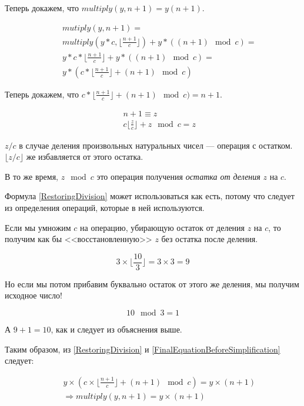 \documentclass{article}
\begin{document}
Теперь докажем, что \(multiply(y, n+1) = y(n+1)\).

\begin{eqnarray}
    &&mutiply(y, n+1) =\\
    &&multiply(y * c, \lfloor \frac{n+1}{c} \rfloor) + y * ((n+1) \mod c) =\\
    &&y*c*\lfloor \frac{n+1}{c} \rfloor + y*((n+1) \mod c) =\\
    &&y*(c * \lfloor \frac{n+1}{c} \rfloor + (n+1) \mod c) \label{FinalEquationBeforeSimplification}
\end{eqnarray}

Теперь докажем, что \(c * \lfloor \frac{n+1}{c} \rfloor + (n+1) \mod c) = n+1\).

\begin{eqnarray}
    &&n+1 \equiv z \\
    &&c\lfloor \frac{z}{c} \rfloor + z \mod c = z \label{RestoringDivision}
\end{eqnarray}

\(z/c\) в случае деления произвольных натуральных чисел --- операция с остатком.
\(\lfloor z/c \rfloor\) же избавляется от этого остатка.

В то же время, \(z \mod c\) это операция получения \textit{остатка от деления} \(z\) на \(c\).

Формула \eqref{RestoringDivision} может использоваться как есть,
потому что следует из определения операций, которые в ней используются.

Если мы умножим \(c\) на операцию, убирающую остаток от деления \(z\) на \(c\),
то получим как бы <<восстановленную>> \(z\) без остатка после деления.

\begin{equation}
    3 \times \lfloor \frac{10}{3} \rfloor = 3 \times 3 = 9
\end{equation}

Но если мы потом прибавим буквально остаток от этого же деления, мы получим исходное число!

\begin{equation}
    10 \mod 3 = 1
\end{equation}

А \(9 + 1 = 10\), как и следует из объяснения выше.

Таким образом, из \eqref{RestoringDivision} и \eqref{FinalEquationBeforeSimplification} следует:

\begin{eqnarray}
    && y \times (c \times \lfloor \frac{n+1}{c} \rfloor + (n+1) \mod c) = y \times (n + 1)\\
    && \Rightarrow multiply(y, n+1) = y \times (n + 1)
\end{eqnarray}
\end{document}
